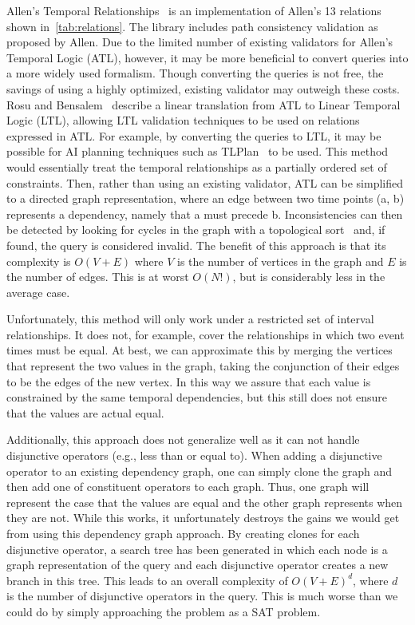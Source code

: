 \documentclass{achemso}
\begin{document}
Allen's Temporal Relationships~\cite{Franke:2011} is an implementation of Allen's 13 relations shown in~\ref{tab:relations}. The library includes path consistency validation as proposed by Allen. Due to the limited number of existing validators for Allen's Temporal Logic (ATL), however, it may be more beneficial to convert queries into a more widely used formalism. Though converting the queries is not free, the savings of using a highly optimized, existing validator may outweigh these costs. Rosu and Bensalem~\cite{Rosu:2006} describe a linear translation from ATL to Linear Temporal Logic (LTL), allowing LTL validation techniques to be used on relations expressed in ATL.
For example, by converting the queries to LTL, it may be possible for AI planning techniques such as TLPlan~\cite{Bacchus:1998} to be used. This method would essentially treat the temporal relationships as a partially ordered set of constraints. Then, rather than using an existing validator, ATL can be simplified to a directed graph representation, where an edge between two time points (a, b) represents a dependency, namely that a must precede b. Inconsistencies can then be detected by looking for cycles in the graph with a topological sort~\cite{Pearce:2004} and, if found, the query is considered invalid.  The benefit of this approach is that its complexity is $O(V + E)$ where $V$ is the number of vertices in the graph and $E$ is the number of edges.  This is at worst $O(N!)$, but is considerably less in the average case.

Unfortunately, this method will only work under a restricted set of interval relationships. It does not, for example, cover the relationships in which two event times must be equal.  At best, we can approximate this by merging the vertices that represent the two values in the graph, taking the conjunction of their edges to be the edges of the new vertex.  In this way we assure that each value is constrained by the same temporal dependencies, but this still does not ensure that the values are actual equal.

Additionally, this approach does not generalize well as it can not handle disjunctive operators (e.g., less than or equal to).  When adding a disjunctive operator to an existing dependency graph, one can simply clone the graph and then add one of constituent operators to each graph.  Thus, one graph will represent the case that the values are equal and the other graph represents when they are not.  While this works, it unfortunately destroys the gains we would get from using this dependency graph approach.  By creating clones for each disjunctive operator, a search tree has been generated in which each node is a graph representation of the query and each disjunctive operator creates a new branch in this tree.  This leads to an overall complexity of $O(V + E)^d$, where $d$ is the number of disjunctive operators in the query.  This is much worse than we could do by simply approaching the problem as a SAT problem.
\end{document}

